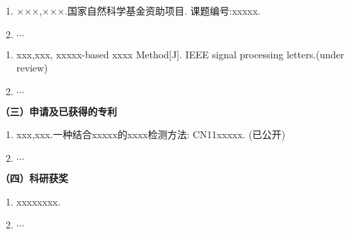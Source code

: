 \begin{achievement}

\project
\begin{enumerate}\setlength{\itemsep}{0pt}
\renewcommand{\labelenumi}{[\theenumi]}
\item ×××,×××.国家自然科学基金资助项目. 课题编号:xxxxx.
\item $\cdots$
\end{enumerate}


\publications
\begin{enumerate}\setlength{\itemsep}{0pt}
\renewcommand{\labelenumi}{[\theenumi]}

\item xxx,xxx, xxxxx-based xxxx Method[J]. IEEE signal processing letters.(under review)
\item $\cdots$

\end{enumerate}

{\noindent\textbf{（三）申请及已获得的专利}}    %
\begin{enumerate}\setlength{\itemsep}{0pt}
\renewcommand{\labelenumi}{[\theenumi]}
\item xxx,xxx.一种结合xxxxx的xxxx检测方法: CN11xxxxx. (已公开)
\item $\cdots$
\end{enumerate}

{\noindent\textbf{（四）科研获奖}}    %
\begin{enumerate}\setlength{\itemsep}{0pt}
\renewcommand{\labelenumi}{[\theenumi]}
\item xxxxxxxx.
\item $\cdots$
\end{enumerate}


\end{achievement} 